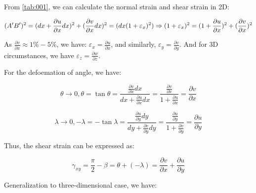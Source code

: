 \documentclass[en,hazy,cyan,8pt,normal]{elegantnote}
\numberwithin{equation}{section}
\begin{document}
    From \cref{tab:001}, we can calculate the normal strain and shear strain in 2D:

    \begin{equation}\label{eq:038}
      (A'B')^2 = (dx + \frac{\partial u}{\partial x} dx)^2 + (\frac{\partial v}{\partial x} dx)^2 = (dx(1+\varepsilon_x)^2)\\
      \Rightarrow (1+\varepsilon_x)^2 = (1+\frac{\partial u}{\partial x})^2 + (\frac{\partial v}{\partial x})^2
    \end{equation}

    As $\displaystyle \frac{\partial v}{\partial x}\approx 1\% - 5\%$, we have: $\displaystyle\varepsilon_x=\frac{\partial u}{\partial x}$, and similarly, $\displaystyle\varepsilon_y=\frac{\partial v}{\partial y}$. And for 3D circumstances, we have $\displaystyle\varepsilon_z=\frac{\partial w}{\partial z}$.

    For the defoemation of angle, we have:

    \begin{equation}\label{eq:039}
      \theta\rightarrow 0, \theta = \tan \theta = \frac{\frac{\partial v}{\partial x}dx}{dx + \frac{\partial u}{\partial x}dx} = \frac{\frac{\partial v}{\partial x}}{1 + \frac{\partial u}{\partial x}} = \frac{\partial v}{\partial x}
    \end{equation}

    \begin{equation}\label{eq:040}
      \lambda\rightarrow 0, -\lambda = -\tan\lambda = \frac{\frac{\partial u}{\partial y}dy}{dy + \frac{\partial v}{\partial y}dy} = \frac{\frac{\partial u}{\partial y}}{1 + \frac{\partial v}{\partial y}} = \frac{\partial u}{\partial y}
    \end{equation}

    Thus, the shear strain can be expressed as:

    \begin{equation}\label{eq:041}
      \gamma_{xy}=\frac{\pi}{2} - \beta = \theta + (-\lambda) = \frac{\partial v}{\partial x} + \frac{\partial u}{\partial y}
    \end{equation}

    Generalization to three-dimensional case, we have:
\end{document}
